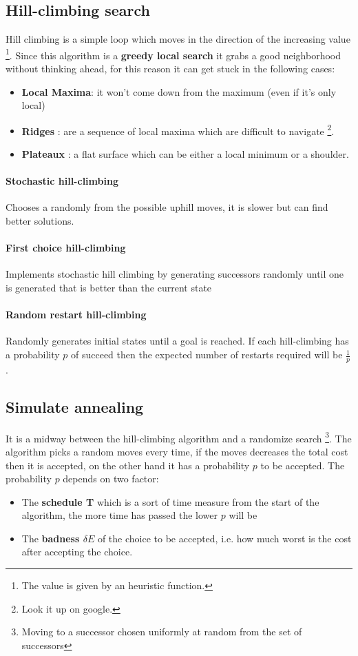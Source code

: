 \documentclass[10pt,a4paper]{article}
\begin{document}
\subsection{Hill-climbing search}
Hill climbing is a simple loop which moves in the direction of the increasing value \footnote{The value is given by an heuristic function.}. Since this algorithm is a \textbf{greedy local search} it grabs  a good neighborhood without thinking ahead, for this reason it can get stuck in the following cases:
\begin{itemize}
\item \textbf{Local Maxima}: it won't come down from the maximum (even if it's only local)
\item \textbf{Ridges} : are a sequence of local maxima which are difficult to navigate \footnote{Look it up on google.}.
\item \textbf{Plateaux} : a flat surface which can be either a local minimum or a shoulder.
\end{itemize}

\paragraph{Stochastic hill-climbing}
Chooses a randomly from the possible uphill moves, it is slower but can find better solutions.

\paragraph{First choice hill-climbing} 
Implements stochastic hill climbing by generating successors randomly until one is generated that is better than the current state

\paragraph{Random restart hill-climbing}
Randomly generates initial states until a goal is reached. If each hill-climbing has a probability $p$ of succeed then the expected number of restarts required will be $\frac{1}{p}$.


\subsection{Simulate annealing}
It is a midway between the hill-climbing algorithm and a randomize search \footnote{Moving to a successor chosen uniformly at random from the set of successors}. The algorithm picks a random moves every time, if the moves decreases the total cost then it is accepted, on the other hand it has a probability $p$ to be accepted. The probability $p$ depends on two factor:
\begin{itemize}
\item The \textbf{schedule T} which is a sort of time measure from the start of the algorithm, the more time has passed the lower $p$ will be
\item The \textbf{badness $\delta E$} of the choice to be accepted, i.e. how much worst is the cost after accepting the choice.
\end{itemize}
\end{document}
